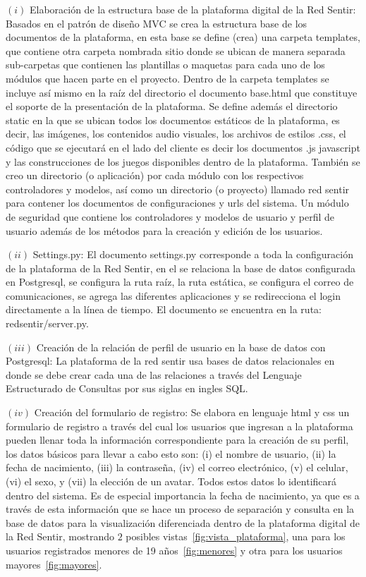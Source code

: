 \documentclass[journal,transmag]{IEEEtran}
\begin{document}
$(i)$ Elaboración de la estructura base de la plataforma digital de la Red Sentir: Basados en el patrón de diseño MVC se crea la estructura base de los documentos de la plataforma, en esta base se define (crea) una carpeta templates, que contiene otra carpeta nombrada sitio donde se ubican de manera separada sub-carpetas que contienen las plantillas o maquetas para cada uno de los módulos que hacen parte en el proyecto. Dentro de la carpeta templates se incluye así mismo en la raíz del directorio el documento base.html que constituye el soporte de la presentación de la plataforma. Se define además el directorio static en la que se ubican todos los documentos estáticos de la plataforma, es decir, las imágenes, los contenidos audio visuales, los archivos de estilos .css, el código que se ejecutará en el lado del cliente es decir los documentos .js javascript y las construcciones de los juegos disponibles dentro de la plataforma. También se creo un directorio (o aplicación) por cada módulo con los respectivos controladores y modelos, así como un directorio (o proyecto) llamado red sentir para contener los documentos de configuraciones y urls del sistema. Un módulo de seguridad que contiene los controladores y modelos de usuario y perfil de usuario además de los métodos para la creación y edición de los usuarios.

$(ii)$ Settings.py: El documento settings.py corresponde a toda la configuración de la plataforma de la Red Sentir, en el se relaciona la base de datos configurada en Postgresql, se configura la ruta raíz, la ruta estática, se configura el correo de comunicaciones, se agrega las diferentes aplicaciones y se redirecciona el login directamente a la línea de tiempo. El documento se encuentra en la ruta: redsentir/server.py.

$(iii)$ Creación de la relación de perfil de usuario en la base de datos con Postgresql: La plataforma de la red sentir usa bases de datos relacionales en donde se debe crear cada una de las relaciones a través del Lenguaje Estructurado de Consultas por sus siglas en ingles SQL.

$(iv)$ Creación del formulario de registro: Se elabora en lenguaje html y css un formulario de registro a través del cual los usuarios que ingresan a la plataforma pueden llenar toda la información correspondiente para la creación de su perfil, los datos básicos para llevar a cabo esto son: (i) el nombre de usuario, (ii) la fecha de nacimiento, (iii) la contraseña, (iv) el correo electrónico, (v) el celular, (vi) el sexo, y (vii) la elección de un avatar. Todos estos datos lo identificará dentro del sistema. Es de especial importancia la fecha de nacimiento, ya que es a través de esta información que se hace un proceso de separación y consulta en la base de datos para la visualización diferenciada dentro de la plataforma digital de la Red Sentir, mostrando $2$ posibles vistas~\ref{fig:vista_plataforma}, una para los usuarios registrados menores de 19 años~\ref{fig:menores} y otra para los usuarios mayores~\ref{fig:mayores}.
\end{document}

